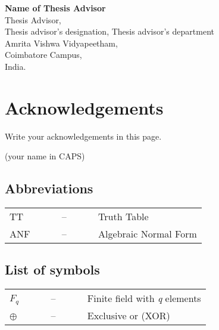 \documentclass[a4paper, 12pt]{report}
\theoremstyle{definition}
\begin{document}
\begin{center}
		\textbf{Name of Thesis Advisor}\\
	Thesis Advisor,\\
	Thesis advisor's designation, 
	Thesis advisor's department \\ Amrita Vishwa Vidyapeetham,\\
	Coimbatore Campus,\\
	India.
\end{center}
	
	\clearpage
	\tableofcontents
	
	\chapter*{Acknowledgements}
	Write your acknowledgements in this page.\\
	\vspace{1cm}
	\begin{flushright}
		(your name in CAPS)
	\end{flushright}
	\listoffigures
	\listoftables
	\newpage
\section*{{\huge Abbreviations}\hfill} 
\vspace{1.2cm}
\begin{tabular}{lll}
TT ~~~~&--&~~~~ Truth Table	\\
ANF ~~~~&--&~~~~ Algebraic Normal Form\\
\end{tabular}	
\newpage
\section*{{\huge List of symbols}\hfill} 
\vspace{1.2cm}
\begin{tabular}{lll}
		$ {F}_q $ ~~~~&--&~~~~ Finite field with \textit{q} elements\\
	
$ \oplus $	~~~~&--&~~~~ Exclusive or (XOR)\\

\end{tabular}
\end{document}
